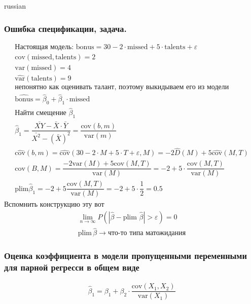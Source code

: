 \documentclass{article}
\begin{document}
\begin{otherlanguage*}{russian}
\begin{enumerate}
\subsubsection*{Ошибка спецификации, задача. }
\begin{align*}
\text{Настоящая модель: } \text{bonus} = 30 - 2 \cdot \text{missed} + 5 \cdot \text{talents} + \varepsilon \\
\text{cov} ( \text{missed}, \text{talents}) = 2 \\
\text{var} (\text{missed}) = 4 \\
\widehat{\text{var}} (\text{talents}) = 9 \\
\text{непонятно как оценивать талант, поэтому выкидываем его из модели} \\
\widehat{\text{bonus}} = \hat \beta_0 + \hat \beta_1 \cdot \text{missed} \\
\text{Найти смещение } \hat \beta_1 \\
\hat \beta_1 = \dfrac{\bar{XY} - \bar{X} \cdot \bar{Y} }{\bar{X^2} - (\bar{X}) ^ 2} = \dfrac{\text{cov} (b, m) }{\text{var}(m) } \\
\hat{\text{cov}} (b, m ) = \hat{\text{cov} } (30 - 2 \cdot M + 5 \cdot T + \varepsilon, M ) =  -2 \hat D (M) + 5 \widehat{\text{cov}} (M, T) \\
\text{cov} (B, M) = \dfrac{-2 \text{var} (M) + 5 \text{cov} (M, T)}{\text{var}(M)} = - 2 + 5 \cdot \dfrac{\text{cov} (M, T) }{\text{var}(M)} \\
\text{plim} \hat  \beta_1 = -2  + 5 \dfrac{\text{cov} (M, T) }{\text{var}(M)} = -2 + 5 \cdot \dfrac{1}{2} = 0.5 
\end{align*} 
Вспомнить конструкцию эту вот 
\begin{align*}
\lim_{n \rightarrow \infty} P(| \hat{\beta} - \text{plim} \,\, \hat \beta | > \varepsilon ) = 0 \\
\text{plim} \, \hat \beta \rightarrow \text{что-то типа матожидания} 
\end{align*}
\end{enumerate}
\subsubsection*{Оценка коэффициента в модели  пропущенными переменными для парной регресси в общем виде}
\begin{align*}
 \hat \beta_1 = \beta_1 + \beta_2 \cdot \dfrac{\text{cov} (X_1, X_2)}{\text{var}(X_1) }
\end{align*}

\end{otherlanguage*}
\end{document}
